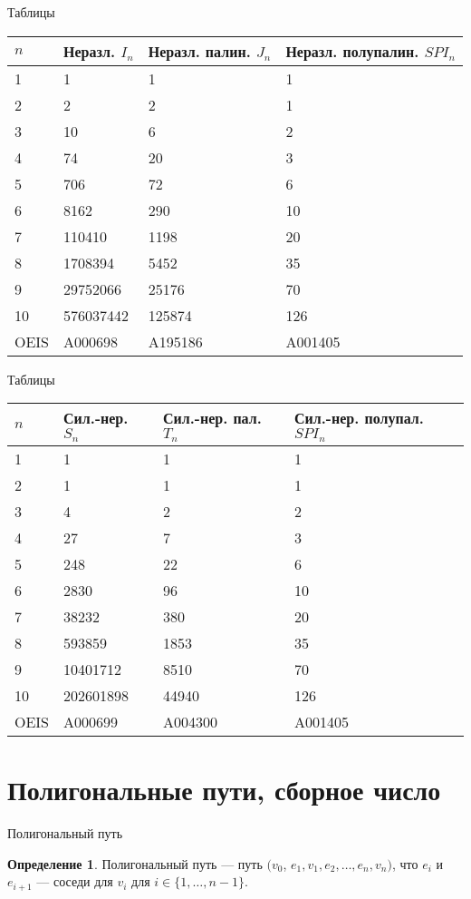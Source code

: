 \documentclass[14pt, aspectratio=169, notheorems]{beamer}
\theoremstyle{plain}
\theoremstyle{definition}
\newtheorem{definition}[theorem]{Определение}
\theoremstyle{remark}
\begin{document}
\begin{frame}{Таблицы}
\centering
\begin{tabular}{|l|l|l|l|}
\hline
$n$ & Неразл. $I_n$ & Неразл. палин. $J_n$ & Неразл. полупалин. $SPI_n$ \\
\hline
1 & 1 & 1 & 1 \\
2 & 2 & 2 & 1 \\
3 & 10 & 6 & 2 \\
4 & 74 & 20 & 3 \\
5 & 706 & 72 & 6 \\
6 & 8162 & 290 & 10 \\
7 & 110410 & 1198 & 20 \\
8 & 1708394 & 5452 & 35 \\
9 & 29752066 & 25176 & 70 \\
10 & 576037442 & 125874 & 126 \\
\hline
OEIS & A000698 & A195186 & A001405 \\
\hline
    \end{tabular}
\end{frame}

\begin{frame}{Таблицы}
\centering
\begin{tabular}{|l|l|l|l|}
\hline
$n$ & Сил.-нер. $S_n$ & Сил.-нер. пал. $T_n$ & Сил.-нер. полупал. $SPI_n$ \\
\hline
1 & 1 & 1 & 1 \\
2 & 1 & 1 & 1 \\
3 & 4 & 2 & 2 \\
4 & 27 & 7 & 3 \\
5 & 248 & 22 & 6 \\
6 & 2830 & 96 & 10 \\
7 & 38232 & 380 & 20 \\
8 & 593859 & 1853 & 35 \\
9 & 10401712 & 8510 & 70 \\
10 & 202601898 & 44940 & 126 \\
\hline
OEIS & A000699 & A004300 & A001405 \\
\hline
    \end{tabular}
\end{frame}

\section{Полигональные пути, сборное число}

\begin{frame}{Полигональный путь}
    \begin{definition}
    Полигональный путь --- путь $(v_0$, $e_1, v_1, e_2 ,\dots, e_n, v_n)$, что $e_i$ и $e_{i + 1}$ --- соседи для $v_i$ для $i \in \{1, \dots, n-1\}$.
    \end{definition}
    \centering
    
\end{frame}
\end{document}

